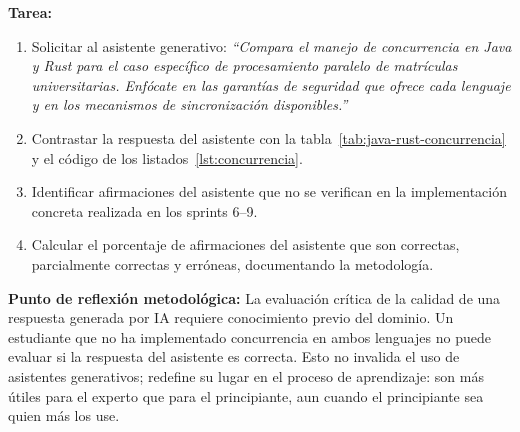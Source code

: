 \vspace{10pt}

\begin{tcolorbox}[actividadIA, title={Actividad IA — Sprint 9: Comparación asistida \java\ vs.\ \rust}]
\textbf{Tarea:}
\begin{enumerate}
  \item Solicitar al asistente generativo: \textit{``Compara el manejo de
  concurrencia en Java y Rust para el caso específico de procesamiento paralelo
  de matrículas universitarias. Enfócate en las garantías de seguridad que
  ofrece cada lenguaje y en los mecanismos de sincronización disponibles.''}
  \item Contrastar la respuesta del asistente con la tabla~\ref{tab:java-rust-concurrencia}
  y el código de los listados~\ref{lst:concurrencia}.
  \item Identificar afirmaciones del asistente que no se verifican en la
  implementación concreta realizada en los sprints 6--9.
  \item Calcular el porcentaje de afirmaciones del asistente que son
  correctas, parcialmente correctas y erróneas, documentando la metodología.
\end{enumerate}

\vspace{6pt}
\textbf{Punto de reflexión metodológica:} La evaluación crítica de la calidad
de una respuesta generada por IA requiere conocimiento previo del dominio.
Un estudiante que no ha implementado concurrencia en ambos lenguajes no puede
evaluar si la respuesta del asistente es correcta. Esto no invalida el uso
de asistentes generativos; redefine su lugar en el proceso de aprendizaje:
son más útiles para el experto que para el principiante, aun cuando el
principiante sea quien más los use.
\end{tcolorbox}
